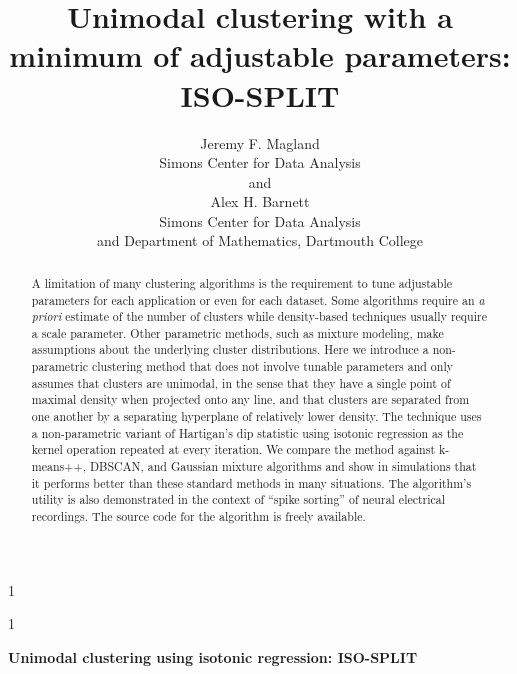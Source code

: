 \documentclass[10pt]{article}
\newcommand{\blind}{1}
\begin{document}


\def\spacingset#1{\renewcommand{\baselinestretch}%
{#1}\small\normalsize} \spacingset{1}


\blind
{
  \title{\bf Unimodal clustering with a minimum of adjustable parameters: ISO-SPLIT}
  \author{Jeremy F. Magland\hspace{.2cm}\\
    Simons Center for Data Analysis\\
    and \\
    Alex H. Barnett \\
    Simons Center for Data Analysis \\ and Department of Mathematics, Dartmouth College}
  \maketitle
} \fi

\blind
{
  \bigskip
  \bigskip
  \bigskip
  \begin{center}
    {\LARGE\bf Unimodal clustering using isotonic regression: ISO-SPLIT}
  \end{center}
  \medskip
} \fi

\bigskip
\begin{abstract}
A limitation of many clustering algorithms is the requirement to tune adjustable parameters for each application or even for each dataset. Some algorithms require an \emph{a priori} estimate of the number of clusters while density-based techniques usually require a scale parameter. Other parametric methods, such as mixture modeling, make assumptions about the underlying cluster distributions. Here we introduce a non-parametric clustering method that does not involve tunable parameters and only assumes that clusters are unimodal, in the sense that they have a single point of maximal density when projected onto any line, and that clusters are separated from one another by a separating hyperplane of relatively lower density. The technique uses a non-parametric variant of Hartigan's dip statistic using isotonic regression as the kernel operation repeated at every iteration. We compare the method against k-means++, DBSCAN, and Gaussian mixture algorithms and show in simulations that it performs better than these standard methods in many situations. The algorithm's utility is also demonstrated in the context of ``spike sorting'' of neural electrical recordings. The source code for the algorithm is freely available.
\end{abstract}
\end{document}
